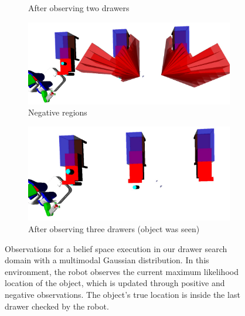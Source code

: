 \begin{figure}
\begin{subfigure}[b]{0.3\linewidth}
    \caption{After observing two drawers}
    \label{fig:step4}
  \end{subfigure}
  \begin{subfigure}[b]{0.3\linewidth}
    \includegraphics[width=\textwidth]{drawer_images/drawer_dist_negreg.png}
    \caption{Negative regions}
    \label{fig:step5}
  \end{subfigure}
  \begin{subfigure}[b]{0.3\linewidth}
    \includegraphics[width=\textwidth]{drawer_images/drawer_dist_3.png}
    \caption{After observing three drawers (object was seen)}
    \label{fig:step6}
  \end{subfigure}
  \caption{Observations for a belief space execution
    in our drawer search domain with a multimodal Gaussian distribution.
    In this environment, the robot observes the current maximum likelihood location
    of the object, which is updated through positive and negative observations. The object's
    true location is inside the last drawer checked by the robot.}
  \label{fig:drawerimgs}
\end{figure}
